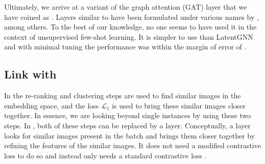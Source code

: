 Ultimately, we arrive at a variant of the graph attention (GAT) layer \parencite{velic018graph} that we have coined as \samp{}. Layers similar to \samp{} have been formulated under various names by \parencite{brody2021attentive,seidenschwarz2021learning}, among others. 
To the best of our knowledge, no one seems to have used it in the context of unsupervised few-shot learning. It is simpler to use than LatentGNN \parencite{zhang2019latentgnn} and with minimal tuning the performance was within the margin of error of \ccclr{}.

\subsection{Link with \ccclr{}}\label{ssec:link-with-c3lr}
In \ccclr{} the re-ranking and clustering steps are used to find similar images in the embedding space, and the loss $\mathcal{L}_1$ is used to bring these similar images closer together. In essence, we are looking beyond single instances by using these two steps. In \samptr{}, both of these steps can be replaced by a \samp{} layer. Conceptually, a \samp{} layer looks for similar images present in the batch and brings them closer together by refining the features of the similar images. It does not need a modified contrastive loss to do so and instead only needs a standard contrastive loss \parencite{chen2020simple}.


